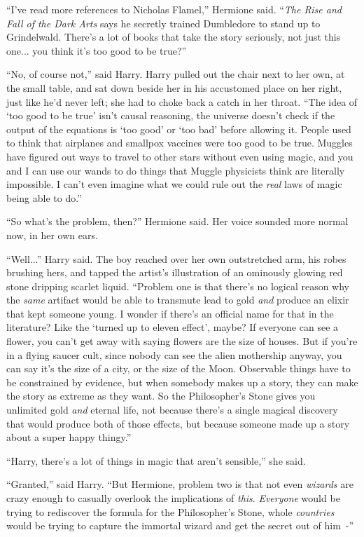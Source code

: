 ``I've read more references to Nicholas Flamel,'' Hermione said. ``\emph{The Rise and Fall of the Dark Arts} says he secretly trained Dumbledore to stand up to Grindelwald. There's a lot of books that take the story seriously, not just this one... you think it's too good to be true?''

``No, of course not,'' said Harry. Harry pulled out the chair next to her own, at the small table, and sat down beside her in his accustomed place on her right, just like he'd never left; she had to choke back a catch in her throat. ``The idea of `too good to be true' isn't causal reasoning, the universe doesn't check if the output of the equations is `too good' or `too bad' before allowing it. People used to think that airplanes and smallpox vaccines were too good to be true. Muggles have figured out ways to travel to other stars without even using magic, and you and I can use our wands to do things that Muggle physicists think are literally impossible. I can't even imagine what we could rule out the \emph{real} laws of magic being able to do.''

``So what's the problem, then?'' Hermione said. Her voice sounded more normal now, in her own ears.

``Well...'' Harry said. The boy reached over her own outstretched arm, his robes brushing hers, and tapped the artist's illustration of an ominously glowing red stone dripping scarlet liquid. ``Problem one is that there's no logical reason why the \emph{same} artifact would be able to transmute lead to gold \emph{and} produce an elixir that kept someone young. I wonder if there's an official name for that in the literature? Like the `turned up to eleven effect', maybe? If everyone can see a flower, you can't get away with saying flowers are the size of houses. But if you're in a flying saucer cult, since nobody can see the alien mothership anyway, you can say it's the size of a city, or the size of the Moon. Observable things have to be constrained by evidence, but when somebody makes up a story, they can make the story as extreme as they want. So the Philosopher's Stone gives you unlimited gold \emph{and} eternal life, not because there's a single magical discovery that would produce both of those effects, but because someone made up a story about a super happy thingy.''

``Harry, there's a lot of things in magic that aren't sensible,'' she said.

``Granted,'' said Harry. ``But Hermione, problem two is that not even \emph{wizards} are crazy enough to casually overlook the implications of \emph{this}. \emph{Everyone} would be trying to rediscover the formula for the Philosopher's Stone, whole \emph{countries} would be trying to capture the immortal wizard and get the secret out of him~-''

